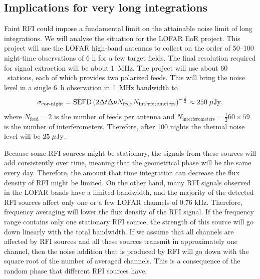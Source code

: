 \documentclass[useAMS,usenatbib]{mn2e}
\begin{document}
\subsection{Implications for very long integrations}
Faint RFI could impose a fundamental limit on the attainable noise limit of long integrations. We will analyse the situation for the LOFAR EoR project. This project will use the LOFAR high-band antennas to collect on the order of 50--100 night-time observations of 6 h for a few target fields. The final resolution required for signal extraction will be about $1$~MHz. The project will use about $60$~stations, each of which provides two polarized feeds. This will bring the noise level in a single 6~h observation in 1~MHz bandwidth to
\begin{equation}
 \sigma_\textrm{eor-night} = \textrm{SEFD} \left(2\Delta t \Delta \nu N_\textrm{feed} N_\textrm{interferometers} \right)^{-\frac{1}{2}} \approx 250\hspace{1mm} \mu\textrm{Jy},
\end{equation}
where $N_\textrm{feed}=2$ is the number of feeds per antenna and $N_\textrm{interferometers}=\frac{1}{2}60\times59$ is the number of interferometers. Therefore, after 100 nights the thermal noise level will be $25\hspace{1mm}\mu\textrm{Jy}$.

Because some RFI sources might be stationary, the signals from these sources will add consistently over time, meaning that the geometrical phase will be the same every day. Therefore, the amount that time integration can decrease the flux density of RFI might be limited. On the other hand, many RFI signals observed in the LOFAR bands have a limited bandwidth, and the majority of the detected RFI sources affect only one or a few LOFAR channels of 0.76 kHz. Therefore, frequency averaging will lower the flux density of the RFI signal. If the frequency range contains only one stationary RFI source, the strength of this source will go down linearly with the total bandwidth. If we assume that all channels are affected by RFI sources and all these sources transmit in approximately one channel, then the noise addition that is produced by RFI will go down with the square root of the number of averaged channels. This is a consequence of the random phase that different RFI sources have.
\end{document}
